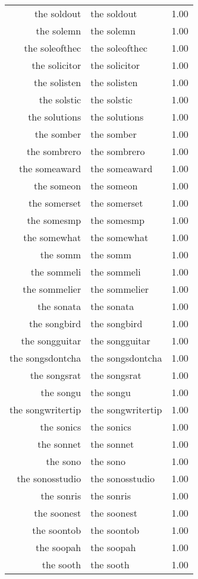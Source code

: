 \begin{table}[ht]
\begin{tabular}{rlr}
  the soldout & the soldout & 1.00 \\ 
  the solemn & the solemn & 1.00 \\ 
  the soleofthec & the soleofthec & 1.00 \\ 
  the solicitor & the solicitor & 1.00 \\ 
  the solisten & the solisten & 1.00 \\ 
  the solstic & the solstic & 1.00 \\ 
  the solutions & the solutions & 1.00 \\ 
  the somber & the somber & 1.00 \\ 
  the sombrero & the sombrero & 1.00 \\ 
  the someaward & the someaward & 1.00 \\ 
  the someon & the someon & 1.00 \\ 
  the somerset & the somerset & 1.00 \\ 
  the somesmp & the somesmp & 1.00 \\ 
  the somewhat & the somewhat & 1.00 \\ 
  the somm & the somm & 1.00 \\ 
  the sommeli & the sommeli & 1.00 \\ 
  the sommelier & the sommelier & 1.00 \\ 
  the sonata & the sonata & 1.00 \\ 
  the songbird & the songbird & 1.00 \\ 
  the songguitar & the songguitar & 1.00 \\ 
  the songsdontcha & the songsdontcha & 1.00 \\ 
  the songsrat & the songsrat & 1.00 \\ 
  the songu & the songu & 1.00 \\ 
  the songwritertip & the songwritertip & 1.00 \\ 
  the sonics & the sonics & 1.00 \\ 
  the sonnet & the sonnet & 1.00 \\ 
  the sono & the sono & 1.00 \\ 
  the sonosstudio & the sonosstudio & 1.00 \\ 
  the sonris & the sonris & 1.00 \\ 
  the soonest & the soonest & 1.00 \\ 
  the soontob & the soontob & 1.00 \\ 
  the soopah & the soopah & 1.00 \\ 
  the sooth & the sooth & 1.00 \\ 

\end{tabular}
\end{table}
